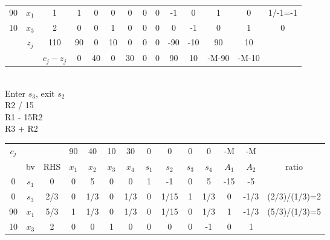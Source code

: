 \documentclass[answers]{exam}
\begin{document}
\begin{questions}
\begin{solution}
\begin{parts}
\begin{tabular}{cccccccccccccc}
		\multicolumn{1}{c|}{90} & \multicolumn{1}{c|}{$x_1$} & \multicolumn{1}{c|}{1}         & 1     & 0     & 0     & 0     & 0     & 0     & -1    & 0     & 1     & 0     & 1/-1=-1   \\
		\multicolumn{1}{c|}{10} & \multicolumn{1}{c|}{$x_3$} & \multicolumn{1}{c|}{2}         & 0     & 0     & 1     & 0     & 0     & 0     & 0     & -1    & 0     & 1     & 0         \\ \cline{1-13}
		& \multicolumn{1}{c|}{$z_j$} & \multicolumn{1}{c|}{110}       & 90    & 0     & 10    & 0     & 0     & 0     & -90   & -10   & 90    & 10    &           \\ \cline{3-13}
		&                            & \multicolumn{1}{c|}{$c_j-z_j$} & 0     & 40    & 0     & 30    & 0     & 0     & 90    & 10    & -M-90 & -M-10 &          
	\end{tabular} \\
	Enter $s_3$, exit $s_2$ \\
	R2 / 15 \\
	R1 - 15R2 \\
	R3 + R2 \\
	\begin{tabular}{cccccccccccccc}
		$c_j$                   &                            &                                & 90    & 40    & 10    & 30    & 0     & 0     & 0     & 0     & -M    & -M    &               \\
		\multicolumn{1}{c|}{}   & \multicolumn{1}{c|}{bv}    & \multicolumn{1}{c|}{RHS}       & $x_1$ & $x_2$ & $x_3$ & $x_4$ & $s_1$ & $s_2$ & $s_3$ & $s_4$ & $A_1$ & $A_2$ & ratio         \\ \cline{1-13}
		\multicolumn{1}{c|}{0}  & \multicolumn{1}{c|}{$s_1$} & \multicolumn{1}{c|}{0}         & 0     & 5     & 0     & 0     & 1     & -1    & 0     & 5     & -15   & -5    &               \\
		\multicolumn{1}{c|}{0}  & \multicolumn{1}{c|}{$s_3$} & \multicolumn{1}{c|}{2/3}       & 0     & 1/3   & 0     & 1/3   & 0     & 1/15  & 1     & 1/3   & 0     & -1/3  & (2/3)/(1/3)=2 \\
		\multicolumn{1}{c|}{90} & \multicolumn{1}{c|}{$x_1$} & \multicolumn{1}{c|}{5/3}       & 1     & 1/3   & 0     & 1/3   & 0     & 1/15  & 0     & 1/3   & 1     & -1/3  & (5/3)/(1/3)=5 \\
		\multicolumn{1}{c|}{10} & \multicolumn{1}{c|}{$x_3$} & \multicolumn{1}{c|}{2}         & 0     & 0     & 1     & 0     & 0     & 0     & 0     & -1    & 0     & 1     &               \\ \cline{1-13}

\end{tabular}
\end{parts}
\end{solution}
\end{questions}
\end{document}
